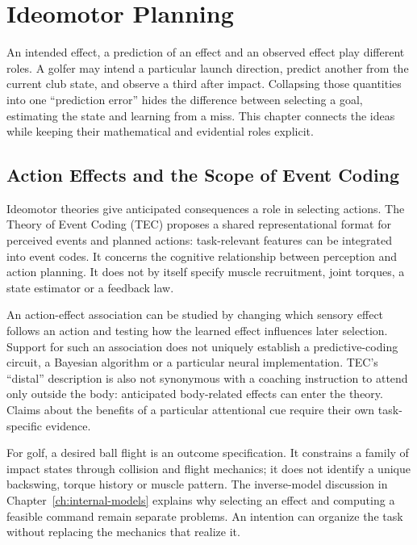 \chapter{Ideomotor Planning}
\label{ch:ideomotor}

An intended effect, a prediction of an effect and an observed effect play different
roles. A golfer may intend a particular launch direction, predict another from the
current club state, and observe a third after impact. Collapsing those quantities
into one ``prediction error'' hides the difference between selecting a goal,
estimating the state and learning from a miss. This chapter connects the ideas
while keeping their mathematical and evidential roles explicit.

\section{Action Effects and the Scope of Event Coding}

Ideomotor theories give anticipated consequences a role in selecting actions.
The Theory of Event Coding (TEC) proposes a shared representational format for
perceived events and planned actions: task-relevant features can be integrated
into event codes\cite{Hommel2001}. It concerns the cognitive relationship between
perception and action planning. It does not by itself specify muscle recruitment,
joint torques, a state estimator or a feedback law.

An action-effect association can be studied by changing which sensory effect
follows an action and testing how the learned effect influences later selection.
Support for such an association does not uniquely establish a predictive-coding
circuit, a Bayesian algorithm or a particular neural implementation. TEC's
``distal'' description is also not synonymous with a coaching instruction to
attend only outside the body: anticipated body-related effects can enter the
theory. Claims about the benefits of a particular attentional cue require their
own task-specific evidence.

For golf, a desired ball flight is an outcome specification. It constrains a
family of impact states through collision and flight mechanics; it does not
identify a unique backswing, torque history or muscle pattern. The inverse-model
discussion in Chapter~\ref{ch:internal-models} explains why selecting an effect
and computing a feasible command remain separate problems. An intention can
organize the task without replacing the mechanics that realize it.

